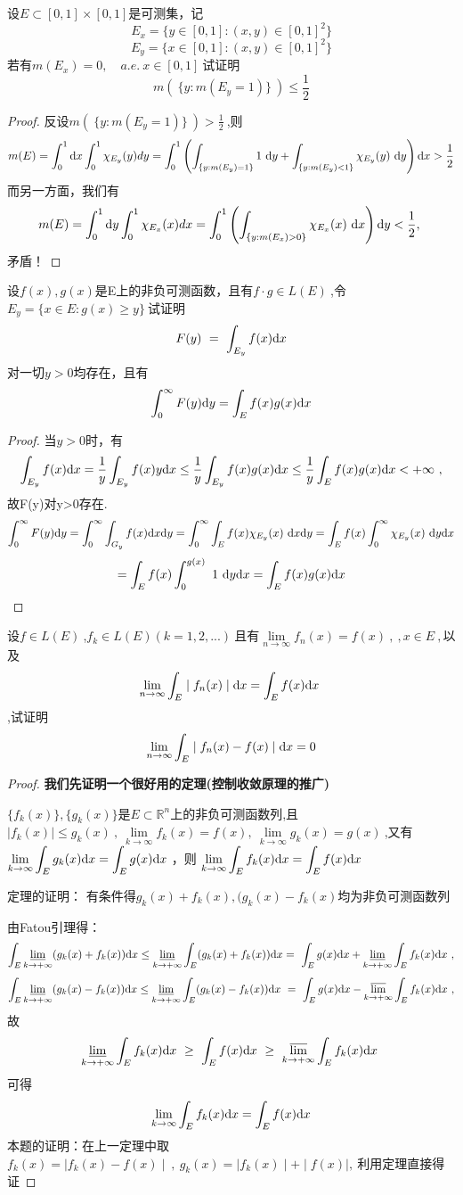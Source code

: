 设$E\subset[0,1]\times[0,1]$是可测集，记$$E_x=\{y\in [0,1]:(x,y)\in [0,1]^2\}$$$$E_y=\{x\in [0,1]:(x,y)\in [0,1]^2\}$$若有$m(E_x)=0,\quad a.e.\ x\in [0,1]\ $试证明$$m(\ \{y:m(E_y=1) \}\ )\leq \frac{1}{2}$$
\begin{proof}
	反设$m(\ \{y:m(E_y=1) \}\ )>\frac{1}{2}\ $,则$$m(E)=\int_{0}^{1}\di{x}\int_{0}^{1}\chi_{E_y}(y)dy = \int_{0}^{1}\left(\int_{\{y:m(E_y)=1\}}1\ \di{y}+\int_{\{y:m(E_y)<1\}}\chi_{E_y}(y)\ \di{y}\right)\di{x}>\frac{1}{2}$$
	而另一方面，我们有$$m(E)=\int_{0}^{1}\di{y}\int_{0}^{1}\chi_{E_x}(x)dx = \int_{0}^{1}\left(\int_{\{y:m(E_x)>0\}}\chi_{E_x}(x)\ \di{x}\right)\di{y}<\frac{1}{2},\ $$矛盾！
\end{proof}


设$f(x),g(x)$是E上的非负可测函数，且有$f·g\in L(E)\ $,令$E_y=\{x\in E:g(x)\geq y\}\ $试证明$$F(y)\ =\ \int_{E_y}f(x) \mathrm{d}x $$对一切$y>0$均存在，且有$$\int_{0}^{\infty}F(y)\mathrm{d}y=\int_E f(x)g(x)\mathrm{d}x$$
\begin{proof}
	当$y>0$时，有$$\int_{E_y}f(x)\di{x}=\frac{1}{y}\int_{E_y}f(x)y\di{x}\leq\frac{1}{y}\int_{E_y}f(x)g(x)\di{x}\leq\frac{1}{y}\int_{E}f(x)g(x)\di{x}<+\infty\ ,$$故F(y)对y>0存在.
	$$\int_{0}^{\infty}F(y)\di{y}=\int_{0}^{\infty}\int_{G_y}f(x)\di{x}\di{y}=\int_{0}^{\infty}\int_{E}f(x)\chi_{E_y}(x)\ \di{x}\di{y}=\int_{E}f(x)\int_{0}^{\infty}\chi_{E_y}(x)\ \di{y}\di{x}$$$$=\int_{E}f(x)\int_{0}^{g(x)}\ 1\ \di{y}\di{x}=\int_Ef(x)g(x)\di{x}$$
\end{proof}



设$f\in L(E) \ $,$f_k\in L(E)(k=1,2,...)\ $且有$\lim\limits_{n \to \infty}f_n(x)=f(x)\ ,\ ,x\in E\ ,$以及$$\lim\limits_{n \to \infty}\int_E \mid f_n(x)\mid \mathrm{d}x=\int_E f(x)\mathrm{d}x\ $$,试证明$$\lim\limits_{n \to \infty}\int_E \mid f_n(x)-f(x)\mid \mathrm{d}x=0$$
\begin{proof}
	\textbf{我们先证明一个很好用的定理(控制收敛原理的推广)}\par
	$\{f_k(x)\},\{g_k(x)\}$是$E \subset \mathbb{R}^n$上的非负可测函数列,且$\mid f_k(x) \mid \leq g_k(x)\ ,\ \lim\limits_{k \to \infty}f_k(x)=f(x),\ \lim\limits_{k \to \infty}g_k(x)=g(x)\ $,又有$\lim\limits_{k \to \infty}\displaystyle{\int_E g_k(x)\mathrm{d}x}=\displaystyle{\int_E g(x)\mathrm{d}x}\ $，则$\ \lim\limits_{k \to \infty}\displaystyle{\int_E f_k(x)\mathrm{d}x}=\displaystyle{\int_E f(x)\mathrm{d}x}\ $\par
	定理的证明： 	有条件得$g_k(x)+f_k(x),(g_k(x)-f_k(x)$均为非负可测函数列\par
	由Fatou引理得：	
	$$\int_E \varliminf_{k \to +\infty}(g_k(x)+f_k(x))\mathrm{d}x\leq \varliminf_{k \to +\infty}\int_E (g_k(x)+f_k(x))\mathrm{d}x=\ \int_E g(x)\mathrm{d}x+\varliminf_{k \to +\infty}\int_E f_k(x)\mathrm{d}x\ ,$$  
	$$\int_E \varliminf_{k \to +\infty}(g_k(x)-f_k(x))\mathrm{d}x\leq \varliminf_{k \to +\infty}\int_E (g_k(x)-f_k(x))\mathrm{d}x\ =\ \int_E g(x)\mathrm{d}x-\varlimsup_{k \to +\infty}\int_E f_k(x)\mathrm{d}x\ ,$$
	故$$\varliminf_{k \to +\infty}\int_E f_k(x)\di{x}\ \geq\  \int_E f(x)\di{x}\ \geq\ \varlimsup_{k \to +\infty}\int_E f_k(x)\di{x}\ $$
	可得$$\ \lim\limits_{k \to \infty}\int_E f_k(x)\di{x}=\int_E f(x)\di{x}\ $$
	本题的证明：在上一定理中取$f_k(x)=\mid f_k(x)-f(x)\mid\ ,\ g_k(x)=\mid f_k(x)\mid+\mid f(x)\mid,\ $利用定理直接得证	
\end{proof}